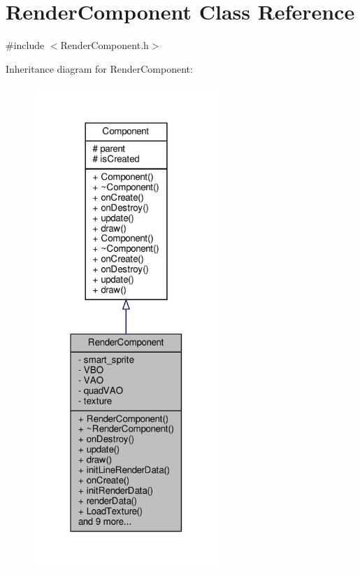 \hypertarget{classRenderComponent}{}\section{Render\+Component Class Reference}
\label{classRenderComponent}


{\ttfamily \#include $<$Render\+Component.\+h$>$}



Inheritance diagram for Render\+Component\+:
\nopagebreak
\begin{figure}[H]
\begin{center}
\leavevmode
\includegraphics[width=199pt]{classRenderComponent__inherit__graph}
\end{center}
\end{figure}


